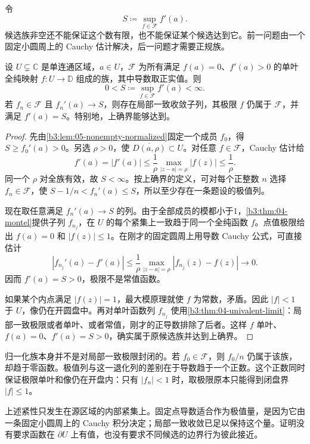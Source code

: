 令
\[
 S\coloneqq\sup_{f\in\mathcal F}f'(a).
\]
候选族非空还不能保证这个数有限，也不能保证某个候选达到它。前一问题由一个固定小圆周上的 Cauchy 估计解决，后一问题才需要正规族。

\begin{lemma}\label{b3:lem:05-extremal-compactness}
设 \(U\subsetneq\mathbb C\) 是单连通区域，\(a\in U\)，\(\mathcal F\) 为所有满足 \(f(a)=0\)、\(f'(a)>0\) 的单叶全纯映射 \(f:U\to\mathbb D\) 组成的族，其中导数取正实值。则
\[
 0<S\coloneqq\sup_{f\in\mathcal F}f'(a)<\infty.
\]
若 \(f_n\in\mathcal F\) 且 \(f_n'(a)\to S\)，则存在局部一致收敛子列，其极限 \(f\) 仍属于 \(\mathcal F\)，并满足 \(f'(a)=S\)。特别地，上确界能够达到。
\end{lemma}
\begin{proof}
先由\cref{b3:lem:05-nonempty-normalized}固定一个成员 \(f_0\)，得 \(S\ge f_0'(a)>0\)。另选 \(\rho>0\)，使 \(\overline{D(a,\rho)}\subset U\)。对任意 \(f\in\mathcal F\)，Cauchy 估计给
\[
 f'(a)=|f'(a)|\le\frac1\rho
 \max_{|z-a|=\rho}|f(z)|\le\frac1\rho.
\]
同一个 \(\rho\) 对全族有效，故 \(S<\infty\)。按上确界的定义，可对每个正整数 \(n\) 选择 \(f_n\in\mathcal F\)，使 \(S-1/n<f_n'(a)\le S\)，所以至少存在一条题设的极值列。

现在取任意满足 \(f_n'(a)\to S\) 的列。由于全部成员的模都小于1，\cref{b3:thm:04-montel}提供子列 \(f_{n_j}\)，在 \(U\) 的每个紧集上一致趋于同一个全纯函数 \(f\)。点值极限给出 \(f(a)=0\) 和 \(|f(z)|\le1\)。在刚才的固定圆周上用导数 Cauchy 公式，可直接估计
\[
 |f_{n_j}'(a)-f'(a)|
 \le\frac1\rho\max_{|z-a|=\rho}|f_{n_j}(z)-f(z)|
 \longrightarrow0.
\]
因而 \(f'(a)=S>0\)，极限不是常值函数。

如果某个内点满足 \(|f(z)|=1\)，最大模原理就使 \(f\) 为常数，矛盾。因此 \(|f|<1\) 于 \(U\)，像仍在开圆盘中。再对单叶函数列 \(f_{n_j}\) 使用\cref{b3:thm:04-univalent-limit}：局部一致极限或者单叶、或者常值，刚才的正导数排除了后者。这样 \(f\) 单叶、\(f(a)=0\)、\(f'(a)=S>0\)，确实属于原候选族并达到上确界。
\end{proof}

归一化族本身并不是对局部一致极限封闭的。若 \(f_0\in\mathcal F\)，则 \(f_0/n\) 仍属于该族，却趋于零函数。极值列与这一退化列的差别在于导数趋于一个正数。这个正数同时保证极限单叶和像仍在开盘内：只有 \(|f_n|<1\) 时，取极限原本只能得到闭盘界 \(|f|\le1\)。

\ProseParagraphBreak

上述紧性只发生在源区域的内部紧集上。固定点导数适合作为极值量，是因为它由一条固定小圆周上的 Cauchy 积分决定；局部一致收敛已足以保持这个量。证明没有要求函数在 \(\partial U\) 上有值，也没有要求不同候选的边界行为彼此接近。

